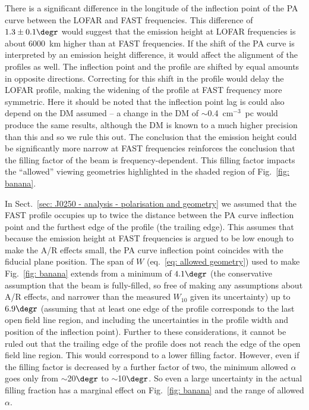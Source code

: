 There is a significant difference in the longitude of the inflection point of the PA curve between the LOFAR and FAST frequencies. This difference of $1.3\pm0.1\degr$ would suggest that the emission height at LOFAR frequencies is about 6000~km higher than at FAST frequencies. If the shift of the PA curve is interpreted by an emission height difference, it would affect the alignment of the profiles as well. The inflection point and the profile are shifted by equal amounts in opposite directions. Correcting for this shift in the profile would delay the LOFAR profile, making the widening of the profile at FAST frequency more symmetric. Here it should be noted that the inflection point lag is could also depend on the DM assumed -- a change in the DM of $\sim$0.4~cm$^{-3}$~pc would produce the same results, although the DM is known to a much higher precision than this and so we rule this out. The conclusion that the emission height could be significantly more narrow at FAST frequencies reinforces the conclusion that the filling factor of the beam is frequency-dependent. This filling factor impacts the ``allowed'' viewing geometries highlighted in the shaded region of Fig.~\ref{fig: banana}.

In Sect.~\ref{sec: J0250 - analysis - polarisation and geometry} we assumed that the FAST profile occupies up to twice the distance between the PA curve inflection point and the furthest edge of the profile (the trailing edge). This assumes that because the emission height at FAST frequencies is argued to be low enough to make the A/R effects small, the PA curve inflection point coincides with the fiducial plane position. The span of $W$ (eq.~\ref{eq: allowed geometry}) used to make Fig.~\ref{fig: banana} extends from  a minimum of $4.1\degr$ (the conservative assumption that the beam is fully-filled, so free of making any assumptions about A/R effects, and narrower than the measured $W_{10}$ given its uncertainty) up to $6.9\degr$ (assuming that at least one edge of the profile corresponds to the last open field line region, and including the uncertainties in the profile width and position of the inflection point). Further to these considerations, it cannot be ruled out that the trailing edge of the profile does not reach the edge of the open field line region. This would correspond to a lower filling factor. However, even if the filling factor is decreased by a further factor of two, the minimum allowed $\alpha$ goes only from $\sim$20$\degr$ to $\sim$10$\degr$. So even a large uncertainty in the actual filling fraction has a marginal effect on Fig.~\ref{fig: banana} and the range of allowed $\alpha$.

